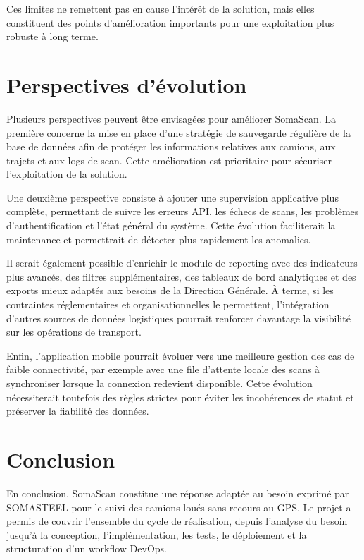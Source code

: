Ces limites ne remettent pas en cause l'intérêt de la solution, mais elles constituent des points d'amélioration importants pour une exploitation plus robuste à long terme.

\section*{Perspectives d'évolution}
{}

Plusieurs perspectives peuvent être envisagées pour améliorer SomaScan. La première concerne la mise en place d'une stratégie de sauvegarde régulière de la base de données afin de protéger les informations relatives aux camions, aux trajets et aux logs de scan. Cette amélioration est prioritaire pour sécuriser l'exploitation de la solution.

Une deuxième perspective consiste à ajouter une supervision applicative plus complète, permettant de suivre les erreurs API, les échecs de scans, les problèmes d'authentification et l'état général du système. Cette évolution faciliterait la maintenance et permettrait de détecter plus rapidement les anomalies.

Il serait également possible d'enrichir le module de reporting avec des indicateurs plus avancés, des filtres supplémentaires, des tableaux de bord analytiques et des exports mieux adaptés aux besoins de la Direction Générale. À terme, si les contraintes réglementaires et organisationnelles le permettent, l'intégration d'autres sources de données logistiques pourrait renforcer davantage la visibilité sur les opérations de transport.

Enfin, l'application mobile pourrait évoluer vers une meilleure gestion des cas de faible connectivité, par exemple avec une file d'attente locale des scans à synchroniser lorsque la connexion redevient disponible. Cette évolution nécessiterait toutefois des règles strictes pour éviter les incohérences de statut et préserver la fiabilité des données.

\section*{Conclusion}
{}

En conclusion, SomaScan constitue une réponse adaptée au besoin exprimé par SOMASTEEL pour le suivi des camions loués sans recours au GPS. Le projet a permis de couvrir l'ensemble du cycle de réalisation, depuis l'analyse du besoin jusqu'à la conception, l'implémentation, les tests, le déploiement et la structuration d'un workflow DevOps.

